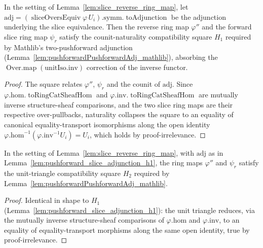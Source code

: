 \begin{lemma}
  \label{lem:pushforward_slice_adjunction_h1}
  In the setting of Lemma~\ref{lem:slice_reverse_ring_map}, let \(\mathrm{adj} =
  (\operatorname{sliceOversEquiv}\varphi\,U_i).\mathrm{symm}.\operatorname{toAdjunction}\) be the
  adjunction underlying the slice equivalence. Then the reverse ring map \(\varphi''\) and the forward
  slice ring map \(\psi_r\) satisfy the counit-naturality compatibility square \(H_1\) required by
  Mathlib's two-pushforward adjunction (Lemma~\ref{lem:pushforwardPushforwardAdj_mathlib}), absorbing
  the \(\operatorname{Over.map}(\mathrm{unitIso}.\mathrm{inv})\) correction of the inverse functor.
\end{lemma}
\begin{proof}
  \leanok
  The square relates \(\varphi''\), \(\psi_r\) and the counit of \(\mathrm{adj}\). Since
  \(\varphi.\mathrm{hom}.\operatorname{toRingCatSheafHom}\) and
  \(\varphi.\mathrm{inv}.\operatorname{toRingCatSheafHom}\) are mutually inverse structure-sheaf
  comparisons, and the two slice ring maps are their respective over-pullbacks, naturality collapses the
  square to an equality of canonical equality-transport isomorphisms along the open identity
  \(\varphi.\mathrm{hom}^{-1}(\varphi.\mathrm{inv}^{-1} U_i) = U_i\), which holds by
  proof-irrelevance.
\end{proof}

\begin{lemma}
  \label{lem:pushforward_slice_adjunction_h2}
  In the setting of Lemma~\ref{lem:slice_reverse_ring_map}, with \(\mathrm{adj}\) as in
  Lemma~\ref{lem:pushforward_slice_adjunction_h1}, the ring maps \(\varphi''\) and \(\psi_r\) satisfy
  the unit-triangle compatibility square \(H_2\) required by
  Lemma~\ref{lem:pushforwardPushforwardAdj_mathlib}.
\end{lemma}
\begin{proof}
  \leanok
  Identical in shape to \(H_1\) (Lemma~\ref{lem:pushforward_slice_adjunction_h1}): the unit triangle
  reduces, via the mutually inverse structure-sheaf comparisons of \(\varphi.\mathrm{hom}\) and
  \(\varphi.\mathrm{inv}\), to an equality of equality-transport morphisms along the same open identity,
  true by proof-irrelevance.
\end{proof}

